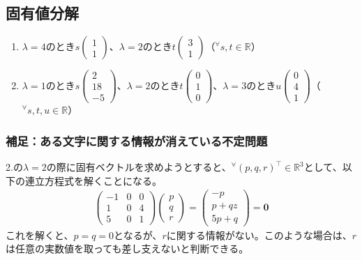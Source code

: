 \documentclass[10pt]{ujarticle}
\begin{document}
\hypertarget{q2}{\subsection{固有値分解}}
\begin{enumerate}
  \item $\lambda=4$のとき$s\begin{pmatrix}1\\1\end{pmatrix}$、$\lambda=2$のとき$t\begin{pmatrix}3\\1\end{pmatrix}$（$^\forall s,t\in\mathbb{R}$）
  \item $\lambda=1$のとき$s\begin{pmatrix}2\\18\\-5\end{pmatrix}$、$\lambda=2$のとき$t\begin{pmatrix}0\\1\\0\end{pmatrix}$、$\lambda=3$のとき$u\begin{pmatrix}0\\4\\1\end{pmatrix}$（$^\forall s,t,u\in\mathbb{R}$）
\end{enumerate}
\subsubsection{補足：ある文字に関する情報が消えている不定問題}
2.の$\lambda=2$の際に固有ベクトルを求めようとすると、$^\forall(p,q,r)^\top\in\mathbb{R}^3$として、以下の連立方程式を解くことになる。
$$
\begin{aligned}
  \begin{pmatrix}
    -1&0&0\\1&0&4\\5&0&1
  \end{pmatrix}\begin{pmatrix}
    p\\q\\r
  \end{pmatrix}=\begin{pmatrix}
    -p\\p+qz\\5p+q
  \end{pmatrix}=\mathbf{0}
\end{aligned}
$$
これを解くと、$p=q=0$となるが、$r$に関する情報がない。このような場合は、$r$は任意の実数値を取っても差し支えないと判断できる。
\end{document}

